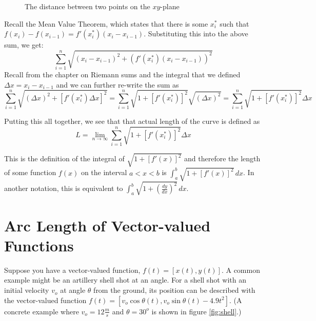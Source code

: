 \begin{figure}[htbp]
\centering
    \caption{The distance between two points on the $xy$-plane}
    \label{fig:distance}
\end{figure}

Recall the Mean Value Theorem, which states that there is some 
$x_i^{\text{*}}$ such that $f(x_i) - f(x_{i-1}) = f'(x_i^{\text{*}})
(x_i - x_{i-1})$. Substituting this into the above sum, we get: 
$$\sum_{i=1}^n \sqrt{(x_i - x_{i-1})^2 + (f'(x_i^{\text{*}})(x_i - x_{i-1}))^2}$$ 
Recall from the chapter on Riemann sums and the integral that we 
defined $\Delta x = x_i - x_{i-1}$ and we can further re-write the 
sum as $$\sum_{i=1}^n \sqrt{(\Delta x)^2 + [f'(x_i^{\text{*}}) \Delta x]^2} 
= \sum_{i=1}^n \sqrt{1+[f'(x_i^{\text{*}})]^2}\sqrt{(\Delta x)^2} = 
\sum_{i=1}^n \sqrt{1+[f'(x_i^{\text{*}})]^2}\Delta x$$

Putting this all together, we see that that actual length of the 
curve is defined as $$L = \lim_{n \to \infty}\sum_{i=1}^n \sqrt{1+
[f'(x_i^{\text{*}})]^2}\Delta x$$

This is the definition of the integral of $\sqrt{1+[f'(x)]^2}$ and 
therefore the length of some function $f(x)$ on the interval $a < x <b$ 
is $\int_a^b \sqrt{1 + [f'(x)]^2}\,dx$. In another notation, this is 
equivalent to $\int_a^b \sqrt{1 + (\frac{dy}{dx})^2}\,dx$. 

\section{Arc Length of Vector-valued Functions}
Suppose you have a vector-valued function, $f(t) = [x(t), y(t)]$. A 
common example might be an artillery shell shot at an angle. For a 
shell shot with an initial velocity $v_o$ at angle $\theta$ from the 
ground, its position can be described with the vector-valued function 
$f(t) = [v_o\cos{\theta}(t), v_o\sin{\theta}(t) - 4.9t^2]$. (A 
concrete example where $v_o = 12 \frac{m}{s}$ and $\theta = 30^o$ is 
shown in figure \ref{fig:shell}.)

